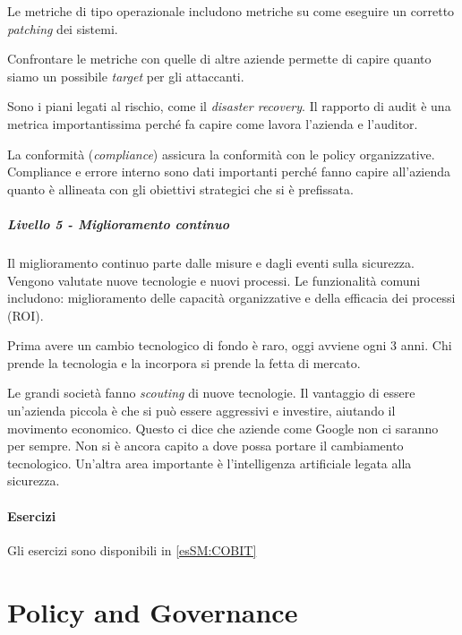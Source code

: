 
Le metriche di tipo operazionale includono metriche su come eseguire 
un corretto \textit{patching} dei sistemi.

Confrontare le metriche con quelle di altre aziende permette di capire quanto 
siamo un possibile \textit{target} per gli attaccanti.


Sono i piani legati al rischio, come il \textit{disaster recovery}.
Il rapporto di audit è una metrica importantissima perché fa capire come 
lavora l'azienda e l'auditor.


La conformità (\textit{compliance}) assicura la conformità con le policy 
organizzative. Compliance e errore interno sono dati importanti perché 
fanno capire all'azienda quanto è allineata con gli obiettivi strategici che 
si è prefissata.


\paragraph{Livello 5 - Miglioramento continuo}

Il miglioramento continuo parte dalle misure e dagli eventi sulla sicurezza.
Vengono valutate nuove tecnologie e nuovi processi. Le funzionalità comuni 
includono: miglioramento delle capacità organizzative e della efficacia dei 
processi (ROI).

Prima avere un cambio tecnologico di fondo è raro, oggi avviene ogni 3 anni. 
Chi prende la tecnologia e la incorpora si prende la fetta di mercato.

Le grandi società fanno \textit{scouting} di nuove tecnologie. Il vantaggio di 
essere un'azienda piccola è che si può essere aggressivi e investire, aiutando 
il movimento economico. Questo ci dice che aziende come Google non ci 
saranno per sempre. Non si è ancora capito a dove possa portare il cambiamento
tecnologico. Un'altra area importante è l'intelligenza artificiale legata 
alla sicurezza.


\subsubsection{Esercizi}

Gli esercizi sono disponibili in \ref{esSM:COBIT}

\chapter{Policy and Governance}
\label{PG}

